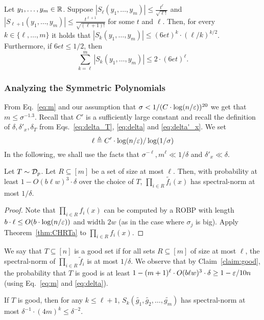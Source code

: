 \begin{theorem}\label{thm:GY}
Let $y_1, \ldots, y_{m} \in {\mathbb{R}}$.
Suppose 
$|S_{\ell}(y_1, \ldots, y_{m})| \le \frac{t^{\ell}}{\sqrt{\ell!}}$ 
and 
$|S_{\ell+1}(y_1, \ldots, y_m)| \le \frac{t^{\ell+1}}{\sqrt{(\ell+1)!}}$
for some $t$ and $\ell$. 
Then, for every 
$k \in \{\ell, \ldots, {m}\}$ 
it holds that 
$|S_{k}(y_1, \ldots, y_{m})| \le (6et)^{k} \cdot (\ell/k)^{k/2}$.
Furthermore, if $6et \le 1/2$, then
$$\sum_{k=\ell}^{{m}} |S_{k}(y_1, \ldots, y_{m})| \le 2\cdot (6et)^{\ell}.$$
\end{theorem}

\subsubsection*{Analyzing the Symmetric Polynomials}
From Eq.~\eqref{eq:m} and our assumption that 
$\sigma < 1/(C\cdot \log(n/\varepsilon))^{20}$ 
we get that $m \le \sigma^{-1.3}$.
Recall that $C'$ is a sufficiently large constant and recall the definition of $\delta, \delta'_x, \delta_T$ from Eqs.~\eqref{eq:delta_T}, \eqref{eq:delta} and \eqref{eq:delta'_x}.
We set 
\begin{equation}
\ell \triangleq C' \cdot \log(n/\varepsilon)/ \log(1/\sigma)
\end{equation}
In the following, we shall use the facts that $\sigma^{-\ell}, m^{\ell} \ll 1/\delta$ and $\delta'_x \ll \delta$.

\begin{claim}\label{claim:good}
Let $T \sim {\mathcal{D}}_p$.
Let $R \subseteq [m]$ be a set of size at most $\ell$.
Then, with probability at least $1-O(b \ell w)^3 \cdot \delta$ over the choice of $T$,
$\prod_{i\in R} \tilde{f_i}(x)$ has spectral-norm at most $1/\delta$.
\end{claim}
\begin{proof}
Note that $\prod_{i\in R} f_i(x)$ can be computed by a ROBP with length $b \cdot \ell \le O(b \cdot \log(n/\varepsilon))$ and width $2w$ (as in the case where $\sigma_j$ is big).
Apply Theorem~\ref{thm:CHRTa} to $\prod_{i\in R} f_i(x)$. 
\end{proof}

We say that $T\subseteq[n]$ is a {\sf good} set if for all sets $R \subseteq [{m}]$ of  size at most $\ell$, 
the spectral-norm of $\prod_{i\in R}{\tilde{f}_i}$ is at most $1/\delta$.
We observe that by Claim~\ref{claim:good}, the probability that $T$ is good is at least 
$1-({m}+1)^{\ell}\cdot O(b\ell w)^3 \cdot \delta \ge 1-\varepsilon/10n$ (using Eq.~\eqref{eq:m} and \eqref{eq:delta}).
\begin{claim}\label{claim:S_k small spectral}
If $T$ is good, then for any $k\le \ell+1$, 
$S_{k}(\tilde{g_1}, \tilde{g_2},\ldots, \tilde{g_{m}})$ has  spectral-norm at most 
$\delta^{-1}\cdot (4{m})^{k} \le \delta^{-2}$.
\end{claim}

